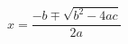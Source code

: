 \documentclass[preview]{standalone}
\begin{document}
\begin{center}
$x= \dfrac{-b \mp \sqrt{b^2 - 4ac}}{2a}$
\end{center}
\end{document}
